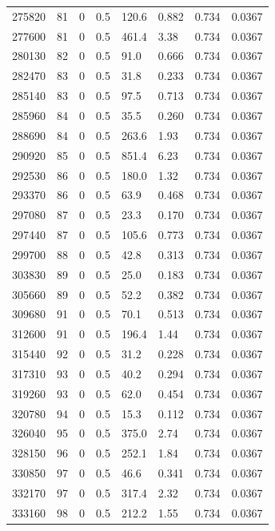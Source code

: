 \documentclass[preview]{standalone}
\begin{document}
{{{{{{{{\begin{tabular}{L{1.2cm}C{1.2cm} C{0.3cm}C{0.5cm} C{1.4cm}C{1.4cm} C{1.4cm}C{1.4cm}}
  275820  &    81  & 0     & 0.5 &  120.6  & 0.882  & 0.734 &  0.0367   \\ 
  277600  &    81  & 0     & 0.5 &  461.4  & 3.38  & 0.734 &  0.0367   \\ 
  280130  &    82  & 0     & 0.5 &  91.0  & 0.666  & 0.734 &  0.0367   \\ 
  282470  &    83  & 0     & 0.5 &  31.8  & 0.233  & 0.734 &  0.0367   \\ 
  285140  &    83  & 0     & 0.5 &  97.5  & 0.713  & 0.734 &  0.0367   \\ 
  285960  &    84  & 0     & 0.5 &  35.5  & 0.260  & 0.734 &  0.0367   \\ 
  288690  &    84  & 0     & 0.5 &  263.6  & 1.93  & 0.734 &  0.0367   \\ 
  290920  &    85  & 0     & 0.5 &  851.4  & 6.23  & 0.734 &  0.0367   \\ 
  292530  &    86  & 0     & 0.5 &  180.0  & 1.32  & 0.734 &  0.0367   \\ 
  293370  &    86  & 0     & 0.5 &  63.9  & 0.468  & 0.734 &  0.0367   \\ 
  297080  &    87  & 0     & 0.5 &  23.3  & 0.170  & 0.734 &  0.0367   \\ 
  297440  &    87  & 0     & 0.5 &  105.6  & 0.773  & 0.734 &  0.0367   \\ 
  299700  &    88  & 0     & 0.5 &  42.8  & 0.313  & 0.734 &  0.0367   \\ 
  303830  &    89  & 0     & 0.5 &  25.0  & 0.183  & 0.734 &  0.0367   \\ 
  305660  &    89  & 0     & 0.5 &  52.2  & 0.382  & 0.734 &  0.0367   \\ 
  309680  &    91  & 0     & 0.5 &  70.1  & 0.513  & 0.734 &  0.0367   \\ 
  312600  &    91  & 0     & 0.5 &  196.4  & 1.44  & 0.734 &  0.0367   \\ 
  315440  &    92  & 0     & 0.5 &  31.2  & 0.228  & 0.734 &  0.0367   \\ 
  317310  &    93  & 0     & 0.5 &  40.2  & 0.294  & 0.734 &  0.0367   \\ 
  319260  &    93  & 0     & 0.5 &  62.0  & 0.454  & 0.734 &  0.0367   \\ 
  320780  &    94  & 0     & 0.5 &  15.3  & 0.112  & 0.734 &  0.0367   \\ 
  326040  &    95  & 0     & 0.5 &  375.0  & 2.74  & 0.734 &  0.0367   \\ 
  328150  &    96  & 0     & 0.5 &  252.1  & 1.84  & 0.734 &  0.0367   \\ 
  330850  &    97  & 0     & 0.5 &  46.6  & 0.341  & 0.734 &  0.0367   \\ 
  332170  &    97  & 0     & 0.5 &  317.4  & 2.32  & 0.734 &  0.0367   \\ 
  333160  &    98  & 0     & 0.5 &  212.2  & 1.55  & 0.734 &  0.0367   \\ 
\hline 
\end{tabular} 

}}}}}}}}
\end{document}
